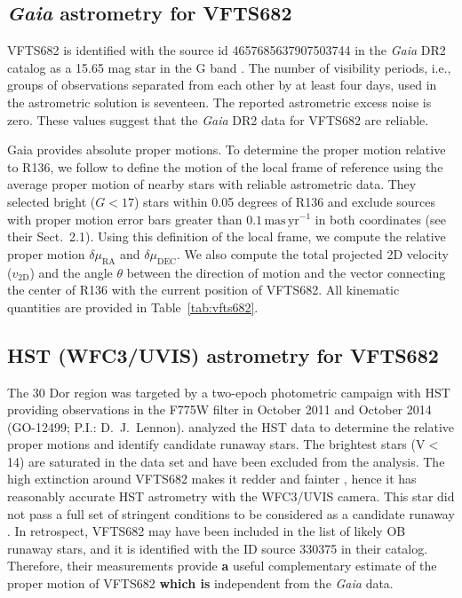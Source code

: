 \documentclass[a4paper,fleqn,usenatbib]{mnras}
\newcommand{\newtext}[1]{{\color{ForestGreen}\bf{#1}}}
\newcommand{\masyr}{\,\mathrm{mas}\,\mathrm{yr}^{-1}}
\DeclareRobustCommand{\Tabref}[1]{Table~\ref{#1}}
\begin{document}
\vspace*{-15pt}
\subsection{ \emph{Gaia} astrometry for VFTS682\label{data:gaia}}


VFTS682 is identified with the source id 4657685637907503744 in the
\emph{Gaia} DR2 catalog %
  as a 15.65 mag star in the G band
\citep{gaia:16,brown:18}.   The number of visibility periods,
i.e., groups of observations separated from each other by at
least four days, used in the astrometric solution is seventeen. The reported astrometric excess noise is zero.  These values
suggest that the \emph{Gaia} DR2  data for VFTS682 are
reliable.

Gaia provides absolute proper motions.  To determine the
proper motion relative to R136, we follow  \citet{lennon:18} to
define the motion of the local frame of reference using the average
proper motion of nearby stars with reliable astrometric data.  They
selected bright ($G<17$) stars within 0.05 degrees of R136 and exclude
sources with proper motion error bars greater than $0.1\masyr$ in both
coordinates (see their  Sect.~2.1).  Using this definition of the
local frame, we compute the relative proper motion
$\delta\mu_\mathrm{RA}$ and $\delta\mu_\mathrm{DEC}$.   We also compute the total projected 2D velocity
($v_\mathrm{2D}$) and the angle $\theta$ between the direction of motion and the vector
connecting the center of R136 with the current position of VFTS682.
All kinematic quantities are provided in
\Tabref{tab:vfts682}. 

\vspace*{-15pt}
\subsection{HST (WFC3/UVIS) astrometry for VFTS682}

The 30 Dor region was targeted by a two-epoch photometric campaign
with HST providing observations in the F775W filter in October 2011
and October 2014 (GO-12499; P.I.: D.~J.~Lennon). 
\citet{platais:15, platais:18} analyzed the HST data to determine the
relative proper motions and identify candidate runaway stars. The
brightest stars (V$<$14) are saturated in the data set and have been
excluded from the analysis. The high extinction around VFTS682
makes it redder and fainter \citep[$V=16.08$,
$B-V=0.58$,][]{evans:11}, hence it has reasonably accurate HST astrometry
with the WFC3/UVIS camera. This star did not pass a full set of stringent
conditions to be considered as a candidate runaway \citep[][]{platais:18}.
In retrospect, VFTS682 may have been included in the list of likely
OB runaway stars, and it is identified
with the ID source 330375 in their catalog. 
Therefore, their measurements provide \newtext{a} useful
complementary estimate of the proper motion of VFTS682 \newtext{which is} independent from the \emph{Gaia} data. 
 
\end{document}
